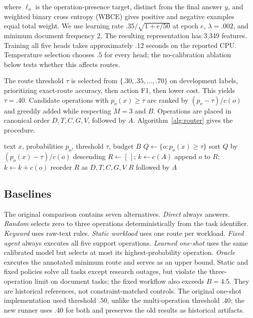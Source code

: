 \documentclass[letterpaper]{article} %
\begin{document}
where $\ell_o$ is the operation-presence target, distinct from the final answer $y$, and weighted binary cross entropy (WBCE) gives positive and negative examples equal total weight. We use learning rate $.35/\sqrt{1+e/50}$ at epoch $e$, $\lambda=.002$, and minimum document frequency 2. The resulting representation has 3,349 features. Training all five heads takes approximately $.12$ seconds on the reported CPU. Temperature selection chooses $.5$ for every head; the no-calibration ablation below tests whether this affects routes.

The route threshold $\tau$ is selected from $\{.30,.35,\ldots,.70\}$ on development labels, prioritizing exact-route accuracy, then action F1, then lower cost. This yields $\tau=.40$. Candidate operations with $p_o(x)\geq\tau$ are ranked by $(p_o-\tau)/c(o)$ and greedily added while respecting $M=3$ and $B$. Operations are placed in canonical order $D,T,C,G,V$, followed by $A$. Algorithm~\ref{alg:router} gives the procedure.

\begin{algorithm}[t]
\caption{Budget-Aware Text Meta-Routing}
\label{alg:router}
\begin{algorithmic}[1]
\REQUIRE text $x$, probabilities $p_o$, threshold $\tau$, budget $B$
\STATE $Q\leftarrow\{o:p_o(x)\geq\tau\}$
\STATE sort $Q$ by $(p_o(x)-\tau)/c(o)$ descending
\STATE $R\leftarrow[\,]$; $k\leftarrow c(A)$
        \STATE append $o$ to $R$; $k\leftarrow k+c(o)$
    \ENDIF
\ENDFOR
\STATE reorder $R$ as $D,T,C,G,V$
\RETURN $R$ followed by $A$
\end{algorithmic}
\end{algorithm}

\subsection{Baselines}

The original comparison contains seven alternatives. \emph{Direct} always answers. \emph{Random} selects zero to three operations deterministically from the task identifier. \emph{Keyword} uses raw-text rules. \emph{Static workload} uses one route per workload. \emph{Fixed agent} always executes all five support operations. \emph{Learned one-shot} uses the same calibrated model but selects at most its highest-probability operation. \emph{Oracle} executes the annotated minimum route and serves as an upper bound. Static and fixed policies solve all tasks except research outages, but violate the three-operation limit on document tasks; the fixed workflow also exceeds $B=4.5$. They are historical references, not constraint-matched controls. The original one-shot implementation used threshold $.50$, unlike the multi-operation threshold $.40$; the new runner uses $.40$ for both and preserves the old results as historical artifacts.
\end{document}
